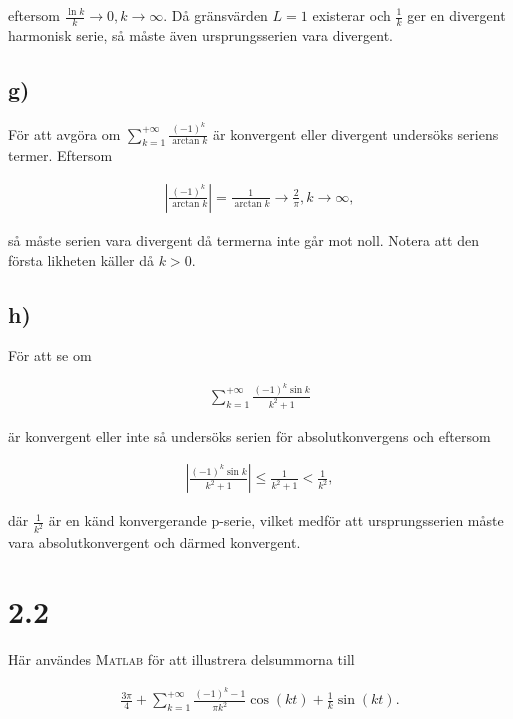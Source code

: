 \documentclass[a4paper]{article}
\begin{document}
eftersom $\frac{\ln k}{k} \to 0, k \to \infty$. Då gränsvärden $L = 1$ existerar
och $\frac{1}{k}$ ger en divergent harmonisk serie, så måste även
ursprungsserien vara divergent.

\subsection*{g)}

För att avgöra om $\sum_{k=1}^{+\infty}\frac{(-1)^k}{\arctan k}$ är konvergent
eller divergent undersöks seriens termer. Eftersom

\begin{align*}
  \left| \frac{(-1)^k}{\arctan k} \right| = \frac{1}{\arctan k} \to \frac{2}{\pi}, k \to \infty,
\end{align*}

så måste serien vara divergent då termerna inte går mot noll. Notera att den
första likheten käller då $k > 0$.

\subsection*{h)}

För att se om

\begin{align*}
  \sum_{k=1}^{+\infty} \frac{(-1)^k\sin k}{k^2 + 1}
\end{align*}

är konvergent eller inte så undersöks serien för absolutkonvergens och eftersom

\begin{align*}
  \left| \frac{(-1)^k\sin k}{k^2 + 1} \right| \leq \frac{1}{k^2 + 1} < \frac{1}{k^2},
\end{align*}

där $\frac{1}{k^2}$ är en känd konvergerande p-serie, vilket medför att
ursprungsserien måste vara absolutkonvergent och därmed konvergent.

\section*{2.2}

Här användes \textsc{Matlab} för att illustrera delsummorna till

\begin{align}
  \frac{3\pi}{4} + \sum_{k=1}^{+\infty}\frac{(-1)^k-1}{\pi k^2}\cos (kt) + \frac{1}{k}\sin (kt).\label{eq:22fourier}
\end{align}
\end{document}
